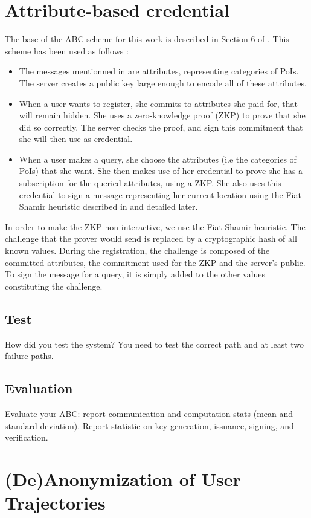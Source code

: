 \documentclass[10pt,conference,compsocconf]{IEEEtran}
\begin{document}
\section{Attribute-based credential}
The base of the ABC scheme for this work is described in Section 6 of \cite{PS_Scheme}. This scheme has been used as follows : 
\begin{itemize}
    \item The messages mentionned in \cite{PS_Scheme} are attributes, representing categories of PoIs. The server creates a public key large enough to encode all of these attributes. 
    \item When a user wants to register, she commits to attributes she paid for, that will remain hidden. She uses a zero-knowledge proof (ZKP) to prove that she did so correctly. The server checks the proof, and sign this commitment that she will then use as credential.
    \item When a user makes a query, she choose the attributes (i.e the categories of PoIs) that she want. She then makes use of her credential to prove she has a subscription for the queried attributes, using a ZKP. She also uses this credential to sign a message representing her current location using the Fiat-Shamir heuristic described in \cite{FSheuristic} and detailed later.
\end{itemize}

In order to make the ZKP non-interactive, we use the Fiat-Shamir heuristic. The challenge that the prover would send is replaced by a cryptographic hash of all known values. During the registration, the challenge is composed of the committed attributes, the commitment used for the ZKP and the server's public. To sign the message for a query, it is simply added to the other values constituting the challenge.

\subsection{Test}
How did you test the system?
You need to test the correct path and at least two failure paths.

\subsection{Evaluation}
Evaluate your ABC: report communication and computation stats (mean and standard
deviation). Report statistic on key generation, issuance, signing, and
verification.

\section{(De)Anonymization of User Trajectories}
\end{document}
